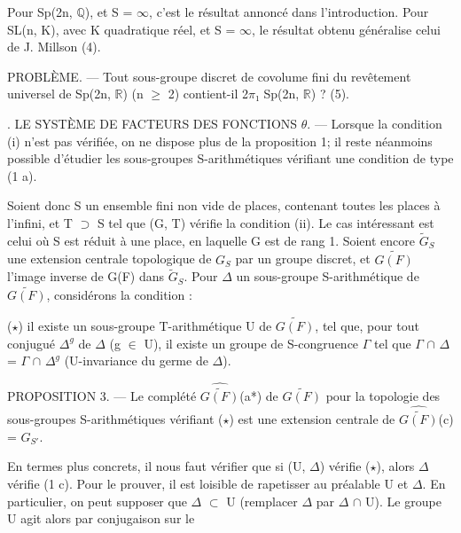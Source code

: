 \documentclass[10pt,a4paper]{article}
\begin{document}
\smallskip
\noindent Pour Sp(2n, \ensuremath{ℚ}), et S = \ensuremath{∞}, c'est le résultat annoncé dans l'introduction. Pour SL(n, K), avec K quadratique réel, et S = \ensuremath{∞}, le résultat obtenu généralise celui de J. Millson (4).\par
\smallskip
\noindent PROBLÈME. — Tout sous-groupe discret de covolume fini du revêtement universel de Sp(2n, \ensuremath{ℝ}) (n \ensuremath{≥} 2) contient-il 2\ensuremath{π₁} Sp(2n, \ensuremath{ℝ}) ? (5).\par
\smallskip
{}. LE SYSTÈME DE FACTEURS DES FONCTIONS \ensuremath{θ}. — Lorsque la condition (i) n'est pas vérifiée, on ne dispose plus de la proposition 1; il reste néanmoins possible d'étudier les sous-groupes S-arithmétiques vérifiant une condition de type (1 a).\par
\smallskip
\noindent Soient donc S un ensemble fini non vide de places, contenant toutes les places à l'infini, et T \ensuremath{⊃} S tel que (G, T) vérifie la condition (ii). Le cas intéressant est celui où S est réduit à une place, en laquelle G est de rang 1. Soient encore \ensuremath{\widetilde{G}_S} une extension centrale topologique de \ensuremath{G_S} par un groupe discret, et \ensuremath{\widetilde{G(F)}} l'image inverse de G(F) dans \ensuremath{\widetilde{G}_S}. Pour \ensuremath{Δ} un sous-groupe S-arithmétique de \ensuremath{\widetilde{G(F)}}, considérons la condition :\par
\smallskip
\noindent (\ensuremath{\star}) il existe un sous-groupe T-arithmétique U de \ensuremath{\widetilde{G(F)}}, tel que, pour tout conjugué \ensuremath{Δ^g} de \ensuremath{Δ} (g \ensuremath{∈} U), il existe un groupe de S-congruence \ensuremath{Γ} tel que \ensuremath{Γ} \ensuremath{∩} \ensuremath{Δ} = \ensuremath{Γ} \ensuremath{∩} \ensuremath{Δ^g} (U-invariance du germe de \ensuremath{Δ}).\par
\smallskip
\noindent PROPOSITION 3. — Le complété \ensuremath{\widehat{\widetilde{G(F)}}}(a*) de \ensuremath{\widetilde{G(F)}} pour la topologie des sous-groupes S-arithmétiques vérifiant (\ensuremath{\star}) est une extension centrale de \ensuremath{\widehat{\widetilde{G(F)}}}(c) = \ensuremath{G_{S′}}.\par
\smallskip
\noindent En termes plus concrets, il nous faut vérifier que si (U, \ensuremath{Δ}) vérifie (\ensuremath{\star}), alors \ensuremath{Δ} vérifie (1 c). Pour le prouver, il est loisible de rapetisser au préalable U et \ensuremath{Δ}. En particulier, on peut supposer que \ensuremath{Δ} \ensuremath{⊂} U (remplacer \ensuremath{Δ} par \ensuremath{Δ} \ensuremath{∩} U). Le groupe U agit alors par conjugaison sur le\par
\clearpage
{}\hypertarget{authority-page-0005}{}
\end{document}
